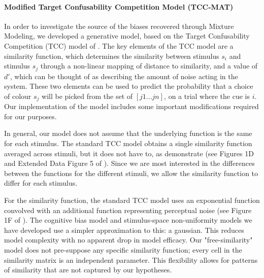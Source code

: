 \paragraph{Modified Target Confusability Competition Model (TCC-MAT)}\label{para:TCC}
In order to investigate the source of the biases recovered through Mixture Modeling, we developed a generative model, based on the Target Confusability Competition (TCC) model of \citet{schurgin_psychophysical_2020}. 
The key elements of the TCC model are a similarity function, which determines the similarity between stimulus $s_i$ and stimulus $s_j$ through a non-linear mapping of distance to similarity, and a value of $d'$, which can be thought of as describing the amount of noise acting in the system. 
These two elements can be used to predict the probability that a choice of colour $s_j$ will be picked from the set of $[j1...jn ]$, on a trial where the cue is $i$. 
Our implementation of the model includes some important modifications required for our purposes.

In general, our model does not assume that the underlying function is the same for each stimulus. 
The standard TCC model obtains a single similarity function averaged across stimuli, but it does not have to, as \citet{schurgin_psychophysical_2020} demonstrate (see Figures 1D and Extended Data Figure 5 of \citet{schurgin_psychophysical_2020}). 
Since we are most interested in the differences between the functions for the different stimuli, we allow the similarity function to differ for each stimulus. 

For the similarity function, the standard TCC model uses an exponential function convolved with an additional function representing perceptual noise (see Figure 1F of \citet{schurgin_psychophysical_2020}). 
The cognitive bias model and stimulus-space non-uniformity models we have developed use a simpler approximation to this: a gaussian.
This reduces model complexity with no apparent drop in model efficacy.
Our "free-similarity" model does not pre-suppose any specific similarity function; every cell in the similarity matrix is an independent parameter.
This flexibility allows for patterns of similarity that are not captured by our hypotheses.

